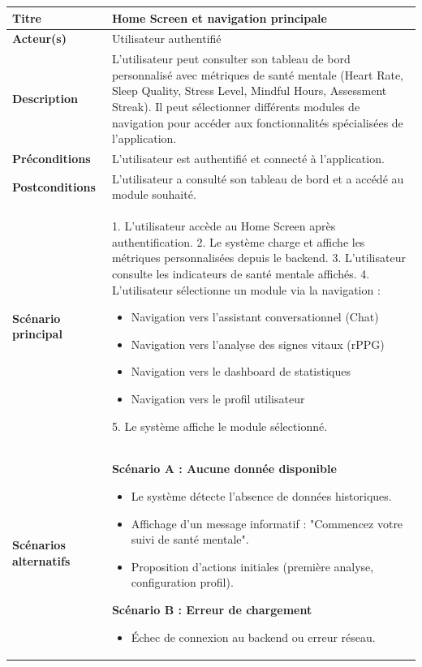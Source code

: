 \begin{table}[H]\centering
\small
\renewcommand{\arraystretch}{1.2}
\begin{tabularx}{\linewidth}{|p{3cm}|X|}
\hline
\textbf{Titre} & Home Screen et navigation principale \\
\hline
\textbf{Acteur(s)} & Utilisateur authentifié \\
\hline
\textbf{Description} & L'utilisateur peut consulter son tableau de bord personnalisé avec métriques de santé mentale (Heart Rate, Sleep Quality, Stress Level, Mindful Hours, Assessment Streak). Il peut sélectionner différents modules de navigation pour accéder aux fonctionnalités spécialisées de l'application. \\
\hline
\textbf{Préconditions} & L'utilisateur est authentifié et connecté à l'application. \\
\hline
\textbf{Postconditions} & L'utilisateur a consulté son tableau de bord et a accédé au module souhaité. \\
\hline
\textbf{Scénario principal} & 
1. L'utilisateur accède au Home Screen après authentification.
2. Le système charge et affiche les métriques personnalisées depuis le backend.
3. L'utilisateur consulte les indicateurs de santé mentale affichés.
4. L'utilisateur sélectionne un module via la navigation :
   \begin{itemize}
       \item Navigation vers l'assistant conversationnel (Chat)
       \item Navigation vers l'analyse des signes vitaux (rPPG)
       \item Navigation vers le dashboard de statistiques
       \item Navigation vers le profil utilisateur
   \end{itemize}
5. Le système affiche le module sélectionné. \\
\hline
\textbf{Scénarios alternatifs} & 
\textbf{Scénario A : Aucune donnée disponible}
\begin{itemize}
    \item Le système détecte l'absence de données historiques.
    \item Affichage d'un message informatif : "Commencez votre suivi de santé mentale".
    \item Proposition d'actions initiales (première analyse, configuration profil).
\end{itemize}
\textbf{Scénario B : Erreur de chargement}
\begin{itemize}
    \item Échec de connexion au backend ou erreur réseau.

\end{itemize}
\end{tabularx}
\end{table}
